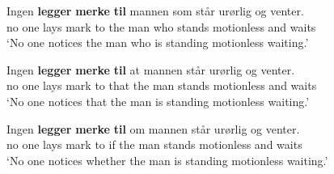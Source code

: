 \documentclass[output=paper]{langsci/langscibook}
\begin{document}
\ea \label{ex:mweiness:leggemerketil-a}
\gll Ingen \textbf{legger} \textbf{merke} \textbf{til} mannen som står urørlig og venter. \\ %
     {no one} lays mark to {the man} who stands motionless and waits \\ %
\glt `No one notices the man who is standing motionless waiting.' %
\z

\ea \label{ex:mweiness:leggemerketil-b}
\gll Ingen \textbf{legger} \textbf{merke} \textbf{til} at mannen står urørlig og venter. \\ %
     {no one} lays mark to that {the man} stands motionless and waits \\ %
\glt `No one notices that the man is standing motionless waiting.' %
\z

\ea \label{ex:mweiness:leggemerketil-c}
\gll Ingen \textbf{legger} \textbf{merke} \textbf{til} om mannen står urørlig og venter. \\ %
     {no one} lays mark to if {the man} stands motionless and waits \\ %
\glt `No one notices whether the man is standing motionless waiting.' %
\z

\end{document}
